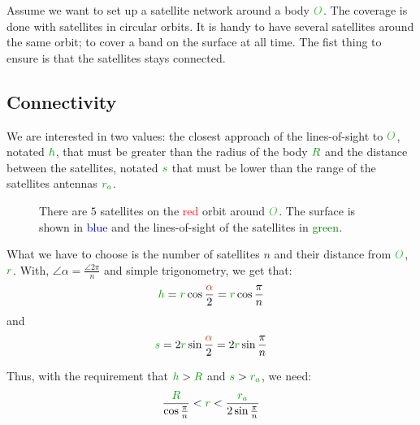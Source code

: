 Assume we want to set up a satellite network around a body
$\posit{O}$. The coverage is done with satellites in circular orbits. It
is handy to have several satellites around the same orbit; to cover a
band on the surface at all time. The fist thing to ensure is that the
satellites stays connected.


\subsection{Connectivity}

We are interested in two values: the closest approach of the
lines-of-sight to $\posit{O}$, notated $\dist{h}$, that must be greater
than the radius of the body $\dist{R}$ and the distance between the
satellites, notated $\dist{s}$ that must be lower than the range of the
satellites antennas $\dist{r_a}$.

\begin{figure}[H]
\centering
\def\n{5}
\caption{
	There are $\n$ satellites on the \textcolor{red}{red} orbit around
	$\posit{O}$. The surface is shown in \textcolor{blue}{blue} and
	the lines-of-sight of the satellites in \textcolor{green}{green}.
}
\end{figure}

What we have to choose is the number of satellites $n$ and their
distance from $\posit{O}$, $\dist{r}$. With, $\angle{\alpha} = \frac
{\angle{2\pi}} n$ and simple trigonometry, we get that:
\[
\dist{h}
= \dist{r} \cos \frac {\angle{\alpha}} 2
= \dist{r} \cos \frac {\pi} n
\]
and
\[
\dist{s}
= 2 \dist{r} \sin \frac {\angle{\alpha}} 2
= 2 \dist{r} \sin \frac {\pi} n
\]

Thus, with the requirement that $\dist{h} > \dist{R}$ and $\dist{s} >
\dist{r_a}$, we need:
\[
\frac {\dist{R}} {\cos \frac {\pi} n}
<
\dist{r}
<
\frac {\dist{r_a}} {2 \sin \frac {\pi} n}
\]

